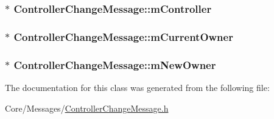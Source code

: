 \subsubsection[{\texorpdfstring{m\+Controller}{mController}}]{$\ast$ Controller\+Change\+Message\+::m\+Controller}\hypertarget{classControllerChangeMessage_a1ab3443d5f211165cde6ec8d92f0e123}{}\label{classControllerChangeMessage_a1ab3443d5f211165cde6ec8d92f0e123}
\subsubsection[{\texorpdfstring{m\+Current\+Owner}{mCurrentOwner}}]{$\ast$ Controller\+Change\+Message\+::m\+Current\+Owner}\hypertarget{classControllerChangeMessage_a88d1428fc03e972c4ea807936264f579}{}\label{classControllerChangeMessage_a88d1428fc03e972c4ea807936264f579}
\subsubsection[{\texorpdfstring{m\+New\+Owner}{mNewOwner}}]{$\ast$ Controller\+Change\+Message\+::m\+New\+Owner}\hypertarget{classControllerChangeMessage_a7781bcb8ef17a2ef18e4098634a03fd7}{}\label{classControllerChangeMessage_a7781bcb8ef17a2ef18e4098634a03fd7}


The documentation for this class was generated from the following file\+:\begin{DoxyCompactItemize}
\item 
Core/\+Messages/\hyperlink{ControllerChangeMessage_8h}{Controller\+Change\+Message.\+h}\end{DoxyCompactItemize}
